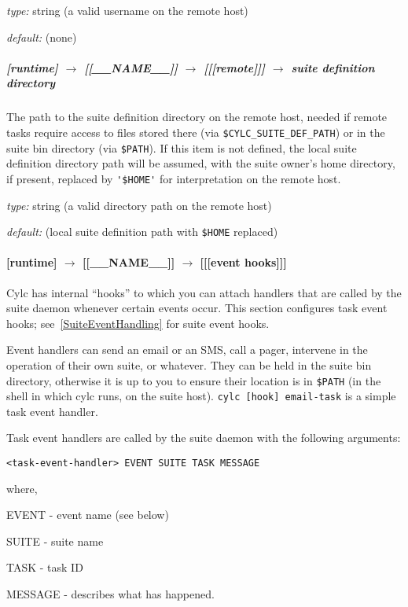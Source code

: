\begin{myitemize}
\item {\em type:} string (a valid username on the remote host)
\item {\em default:} (none)
\end{myitemize}

\subparagraph[suite definition directory]{[runtime] $\rightarrow$ [[\_\_NAME\_\_]] $\rightarrow$ [[[remote]]] $\rightarrow$  suite definition directory}

The path to the suite definition directory on the remote host, needed if
remote tasks require access to files stored there (via
\lstinline=$CYLC_SUITE_DEF_PATH=) or in the suite bin directory (via
\lstinline=$PATH=).  If this item is not defined, the local suite
definition directory path will be assumed, with the suite owner's home
directory, if present, replaced by \lstinline='$HOME'= for
interpretation on the remote host.

\begin{myitemize}
\item {\em type:} string (a valid directory path on the remote host)
\item {\em default:} (local suite definition path with \lstinline=$HOME=
    replaced)
\end{myitemize}


\paragraph[{[[[}event hooks{]]]}]{[runtime] $\rightarrow$ [[\_\_NAME\_\_]] $\rightarrow$ [[[event hooks]]]}
\label{TaskEventHandling}

Cylc has internal ``hooks'' to which you can attach handlers that are
called by the suite daemon whenever certain events occur. This section
configures task event hooks; see~\ref{SuiteEventHandling} for
suite event hooks.

Event handlers can send an email or an SMS, call a pager, intervene
in the operation of their own suite, or whatever.
They can be held in the suite bin directory, otherwise it is up to you
to ensure their location is in \lstinline=$PATH= (in the shell in which
cylc runs, on the suite host).
\lstinline=cylc [hook] email-task= is a simple task event handler.

Task event handlers are called by the suite daemon with the following arguments:
\begin{lstlisting}
<task-event-handler> EVENT SUITE TASK MESSAGE
\end{lstlisting}
where,
\begin{myitemize}
    \item EVENT - event name (see below)
    \item SUITE - suite name
    \item TASK  - task ID
    \item MESSAGE - describes what has happened.
\end{myitemize}

